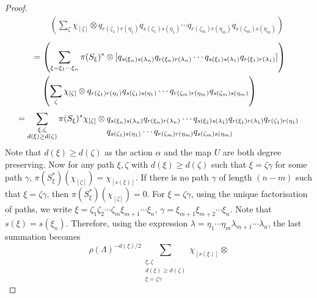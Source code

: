 \documentclass[10pt,a4paper]{amsart}
\begin{document}
\begin{proof}
\begin{equation*}
\begin{aligned}
&\;\;\;\;\left(\sum\limits_{\zeta}\chi_{[\zeta]}\otimes q_{r(\zeta_{1})r(\eta_{1})}q_{s(\zeta_{1})s(\eta_{1})}\cdots q_{r(\zeta_{m})r(\eta_{m})}q_{s(\zeta_{m})s(\eta_{m})}\right)
    \end{aligned}
\end{equation*}
\begin{equation*}\hfill
    \begin{aligned}
&=\left(\sum\limits_{\substack{\xi=\xi_{1}\cdots\xi_{n}}}\pi(S_{\xi})^{\ast}\otimes [q_{s(\xi_{n})s(\lambda_{n})}q_{r(\xi_{n})r(\lambda_{n})}\cdots  q_{s(\xi_{1})s(\lambda_{1})}q_{r(\xi_{1})r(\lambda_{1})}] \right)\\
&\;\;\;\;\left(\sum\limits_{\zeta}\chi_{[\zeta]}\otimes q_{r(\zeta_{1})r(\eta_{1})}q_{s(\zeta_{1})s(\eta_{1})}\cdots q_{r(\zeta_{m})r(\eta_{m})}q_{s(\zeta_{m})s(\eta_{m})}\right)
\\
\end{aligned}
\end{equation*} 
\begin{equation*}\hfill
    =\sum\limits_{\substack{\xi,\zeta\\ d(\xi)\geq d(\zeta)}}\pi(S_{\xi})^{*}\chi_{[\zeta]}\otimes 
\begin{aligned}[t]
&q_{s(\xi_{n})s(\lambda_{n})}q_{r(\xi_{n})r(\lambda_{n})}\cdots  q_{s(\xi_{1})s(\lambda_{1})}q_{r(\xi_{1})r(\lambda_{1})}q_{r(\zeta_{1})r(\eta_{1})}\\
&q_{s(\zeta_{1})s(\eta_{1})}\cdots q_{r(\zeta_{m})r(\eta_{m})}q_{s(\zeta_{m})s(\eta_{m})}
\end{aligned}
\end{equation*}
Note that $d(\xi)\geq d(\zeta)$ as the action $\alpha$ and the map $U$ are both degree preserving. Now for any path $\xi,\zeta$ with $d(\xi)\geq d(\zeta)$ such that $\xi=\zeta\gamma$ for some path $\gamma$, $\pi(S_{\xi}^{\ast})(\chi_{[\zeta]})=\chi_{[s(\xi)]}$. If there is no path $\gamma$ of length $(n-m)$ such that $\xi=\zeta\gamma$, then $\pi(S_{\xi}^{\ast})(\chi_{[\zeta]})=0$. For $\xi=\zeta\gamma$, using the unique factorisation of paths, we write $\xi=\zeta_{1}\zeta_{2}\cdots \zeta_{m}\xi_{m+1}\cdots \xi_{n}$, $\gamma=\xi_{m+1}\xi_{m+2}\cdots \xi_{n}$. Note that $s(\xi)=s(\xi_{n})$. Therefore, using the expression $\lambda=\eta_{1}\cdots \eta_{m}\lambda_{m+1}\cdots\lambda_{n}$, the last summation becomes
\begin{equation*}
    \rho(\Lambda)^{-d(\xi)/2}\sum\limits_{\substack{\xi,\zeta\\ d(\xi)\geq d(\zeta) \\ \xi=\zeta\gamma}}\chi_{[s(\xi)]}\otimes 

\end{equation*}
\end{proof}
\end{document}
